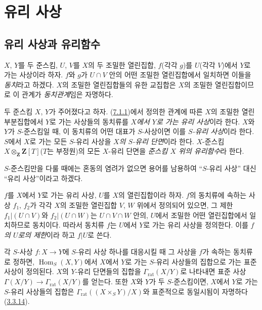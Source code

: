 \section{유리 사상}
\label{section:I.7-ko}

\subsection{유리 사상과 유리함수}
\label{subsection:I.7.1-ko}

\begin{env}[7.1.1]
\label{I.7.1.1-ko}
$X$, $Y$를 두 준스킴, $U$, $V$를 $X$의 두 조밀한 열린집합,
$f$(각각 $g$)를 $U$(각각 $V$)에서 $Y$로 가는 사상이라 하자.
$f$와 $g$가 $U\cap V$ 안의 어떤 조밀한 열린집합에서 일치하면
이들을 \emph{동치}라고 하겠다. $X$의 조밀한 열린집합들의 유한
교집합은 $X$의 조밀한 열린집합이므로 이 관계가
\emph{동치관계}임은 자명하다.
\end{env}

\begin{definition}[7.1.2]
\label{I.7.1.2-ko}
두 준스킴 $X$, $Y$가 주어졌다고 하자.
(\hyperref[I.7.1.1-ko]{7.1.1})에서 정의한 관계에 따른 $X$의 조밀한
열린 부분집합에서 $Y$로 가는 사상들의 동치류를
\emph{$X$에서 $Y$로 가는 유리 사상}이라 한다. $X$와 $Y$가
$S$-준스킴일 때, 이 동치류의 어떤 대표가 $S$-사상이면 이를
\emph{$S$-유리 사상}이라 한다. $S$에서 $X$로 가는 모든
$S$-유리 사상을 \emph{$X$의 $S$-유리 단면}이라 한다. $X$-준스킴
$X\otimes_{\mathbf{Z}}\mathbf{Z}[T]$($T$는 부정원)의 모든
$X$-유리 단면을 \emph{준스킴 $X$ 위의 유리함수}라 한다.

$S$-준스킴만을 다룰 때에는 혼동의 염려가 없으면 용어를 남용하여
``$S$-유리 사상'' 대신 ``유리 사상''이라고 하겠다.

$f$를 $X$에서 $Y$로 가는 유리 사상, $U$를 $X$의 열린집합이라 하자.
$f$의 동치류에 속하는 사상 $f_1$, $f_2$가 각각 $X$의 조밀한
열린집합 $V$, $W$ 위에서 정의되어 있으면, 그 제한
$f_1|(U\cap V)$와 $f_2|(U\cap W)$는 $U\cap V\cap W$ 안의,
$U$에서 조밀한 어떤 열린집합에서 일치하므로 동치이다. 따라서
동치류 $f$는
$U$에서 $Y$로 가는 유리 사상을 정의한다. 이를
\emph{$f$의 $U$로의 제한}이라 하고 $f|U$로 쓴다.

각 $S$-사상 $f:X\to Y$에 $S$-유리 사상 하나를 대응시킬 때 그 사상을
$f$가 속하는 동치류로 정하면,
$\operatorname{Hom}_S(X,Y)$에서 $X$에서 $Y$로 가는 $S$-유리 사상들의
집합으로 가는 표준 사상이 정의된다. $X$의 $Y$-유리 단면들의 집합을
$\Gamma_{\mathrm{rat}}(X/Y)$로 나타내면 표준 사상
$\Gamma(X/Y)\to\Gamma_{\mathrm{rat}}(X/Y)$를 얻는다. 또한 $X$와 $Y$가
두 $S$-준스킴이면, $X$에서 $Y$로 가는 $S$-유리 사상들의 집합은
$\Gamma_{\mathrm{rat}}((X\times_S Y)/X)$와 표준적으로 동일시됨이
자명하다
(\hyperref[I.3.3.14-ko]{3.3.14}).
\end{definition}


